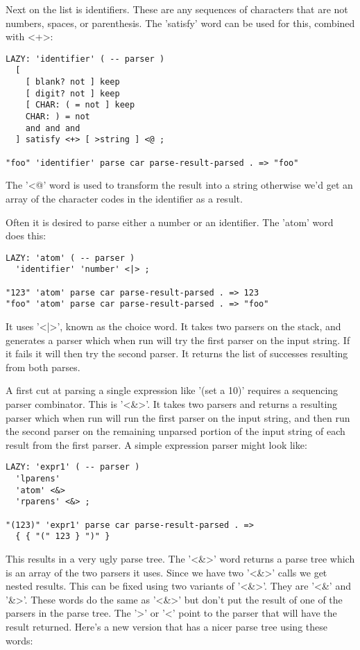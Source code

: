 Next on the list is identifiers. These are any sequences of characters
that are not numbers, spaces, or parenthesis. The 'satisfy' word can
be used for this, combined with <+>:

\begin{verbatim}
LAZY: 'identifier' ( -- parser )
  [ 
    [ blank? not ] keep 
    [ digit? not ] keep 
    [ CHAR: ( = not ] keep 
    CHAR: ) = not 
    and and and    
  ] satisfy <+> [ >string ] <@ ;

"foo" 'identifier' parse car parse-result-parsed . => "foo"
\end{verbatim}

The '<@' word is used to transform the result into a string otherwise
we'd get an array of the character codes in the identifier as a
result.

Often it is desired to parse either a number or an identifier. The
'atom' word does this:

\begin{verbatim}
LAZY: 'atom' ( -- parser )
  'identifier' 'number' <|> ;

"123" 'atom' parse car parse-result-parsed . => 123
"foo" 'atom' parse car parse-result-parsed . => "foo"
\end{verbatim}

It uses '<|>', known as the choice word. It takes two parsers on the
stack, and generates a parser which when run will try the first parser
on the input string. If it fails it will then try the second
parser. It returns the list of successes resulting from both parses.

A first cut at parsing a single expression like '(set a 10)' requires
a sequencing parser combinator. This is '<\&>'. It takes two parsers
and returns a resulting parser which when run will run the first
parser on the input string, and then run the second parser on the
remaining unparsed portion of the input string of each result from the
first parser. A simple expression parser might look like:

\begin{verbatim}
LAZY: 'expr1' ( -- parser )
  'lparens' 
  'atom' <&>
  'rparens' <&> ;

"(123)" 'expr1' parse car parse-result-parsed . =>
  { { "(" 123 } ")" }
\end{verbatim}

This results in a very ugly parse tree. The '<\&>' word returns a parse
tree which is an array of the two parsers it uses. Since we have two
'<\&>' calls we get nested results. This can be fixed using two
variants of '<\&>'. They are '<\&' and '\&>'. These words do the same as
'<\&>' but don't put the result of one of the parsers in the parse
tree. The '>' or '<' point to the parser that will have the result
returned. Here's a new version that has a nicer parse tree using these
words:

